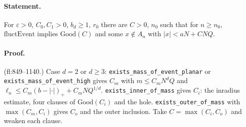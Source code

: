 \paragraph{Statement.} For $\varepsilon>0$, $C_0,C_1>0$, $b_d\geq1$, $r_0$ there are $C>0$, $n_0$ such that for $n\geq n_0$, $\mathrm{fluctEvent}$ implies $\mathrm{Good}(C)$ and some $x\notin A_n$ with $|x|<aN+CNQ$.
\paragraph{Proof.} (fl:849--1140.) Case $d=2$ or $d\geq3$: \texttt{exists\_mass\_of\_event\_planar} or \texttt{exists\_mass\_of\_event\_high} gives $C_m$ with $m\leq C_mN^dQ$ and
$\ell_n\leq C_m(b-|\cdot|)_++C_mNQ^{1/d}$. \texttt{exists\_inner\_of\_mass} gives $C_i$: the inradius estimate, four clauses of $\mathrm{Good}(C_i)$ and the hole.
\texttt{exists\_outer\_of\_mass} with $\max(C_m,C_i)$ gives $C_o$ and the outer inclusion. Take $C=\max(C_i,C_o)$ and weaken each clause.

